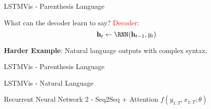 \begin{frame}{LSTMVis - Parenthesis Language}
  \vspace{-0.25cm}

  \begin{center}
  \end{center}
\end{frame}


\begin{frame}{What can the decoder learn to say?}
  \textcolor{red}{Decoder}:
  \[{\mathbf{h}_t \gets \RNN(\mathbf{h}_{t-1}, y_t)} \]
  
  \pause

  \air

  \textbf{Harder Example}: 
  Natural language outputs with complex syntax. 


\end{frame}

\begin{frame}{LSTMVis - Parenthesis Language}
  \vspace{-0.25cm}

  \begin{center}
  \end{center}
\end{frame}


\begin{frame}{LSTMVis - Natural Language}
  \vspace{-0.25cm}


  \begin{center}
  \end{center}
\end{frame}


\begin{frame}{Recurrent Neural Network 2 - Seq2Seq + Attention}{ $f(y_{1:T}, x_{1:T}; \theta)$}
  \vspace{-0.3cm}

  \begin{center}
  \end{center}
\end{frame}

